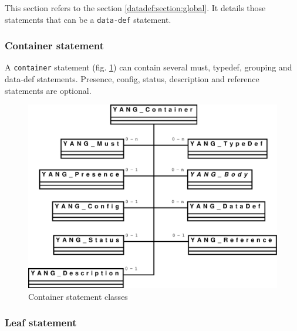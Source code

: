 \documentclass[a4paper]{article}
\begin{document}
This  section refers to  the section  \ref{datadef:section:global}. It
details those statements that can be a {\tt data-def} statement.

\subsubsection{Container statement}

A  {\tt  container}  statement  (fig.   \ref{container})  can  contain
several  must, typedef,  grouping and  data-def  statements. Presence,
config, status, description and reference statements are optional.
\begin{figure}[htbp]
\begin{center}
\includegraphics[scale = .3]{container.eps}
\end{center}
\caption{Container statement classes}
\label{container}
\end{figure}

\subsubsection{Leaf statement}
\end{document}
